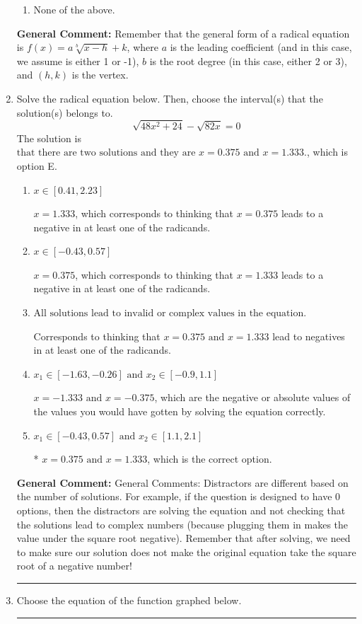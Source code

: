 \documentclass{extbook}[14pt]
\newcommand{\litem}[1]{\item #1

\rule{\textwidth}{0.4pt}}
\begin{document}
\begin{enumerate}
{\begin{enumerate}[label=\Alph*.]
\begin{multicols}{2}
\end{multicols}\item None of the above.\end{enumerate}
\textbf{General Comment:} Remember that the general form of a radical equation is $ f(x) = a \sqrt[b]{x - h} + k $, where $a$ is the leading coefficient (and in this case, we assume is either 1 or -1), $b$ is the root degree (in this case, either 2 or 3), and $(h, k)$ is the vertex.
}
\litem{
Solve the radical equation below. Then, choose the interval(s) that the solution(s) belongs to.
\[ \sqrt{48 x^2 + 24} - \sqrt{82 x} = 0 \]The solution is \( \text{that there are two solutions and they are } x = 0.375 \text{ and } x = 1.333. \), which is option E.\begin{enumerate}[label=\Alph*.]
\item \( x \in [0.41,2.23] \)

$x = 1.333$, which corresponds to thinking that $x = 0.375$ leads to a negative in at least one of the radicands.
\item \( x \in [-0.43,0.57] \)

$x = 0.375$, which corresponds to thinking that $x = 1.333$ leads to a negative in at least one of the radicands.
\item \( \text{All solutions lead to invalid or complex values in the equation.} \)

Corresponds to thinking that $x = 0.375 \text{ and } x = 1.333$ lead to negatives in at least one of the radicands.
\item \( x_1 \in [-1.63, -0.26] \text{ and } x_2 \in [-0.9,1.1] \)

$x = -1.333 \text{ and } x = -0.375$, which are the negative or absolute values of the values you would have gotten by solving the equation correctly.
\item \( x_1 \in [-0.43, 0.57] \text{ and } x_2 \in [1.1,2.1] \)

* $x = 0.375 \text{ and } x = 1.333$, which is the correct option.
\end{enumerate}

\textbf{General Comment:} General Comments: Distractors are different based on the number of solutions. For example, if the question is designed to have 0 options, then the distractors are solving the equation and not checking that the solutions lead to complex numbers (because plugging them in makes the value under the square root negative). Remember that after solving, we need to make sure our solution does not make the original equation take the square root of a negative number!
}
\litem{
Choose the equation of the function graphed below.

}
\end{enumerate}
\end{document}
